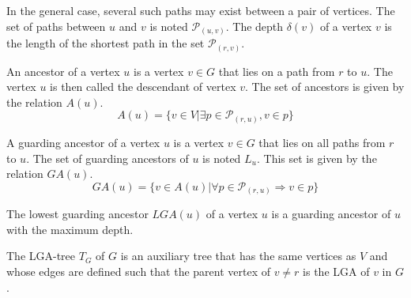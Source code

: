 In the general case, several such paths may exist between a pair of vertices.
The set of paths between $u$ and $v$ is noted $\mathcal{P}_{(u,v)}$.
The depth $\delta(v)$ of a vertex $v$ is the length of the shortest path in the set $\mathcal{P}_{(r,v)}$.
\begin{definition}
	An ancestor of a vertex $u$ is a vertex $v \in G$ that lies on a path from $r$ to $u$. The vertex $u$ is then called the descendant of vertex $v$.
	The set of ancestors is given by the relation $A(u)$.
	\begin{equation*}
		A(u)=\{v\in V|\exists p\in \mathcal{P}_{(r,u)}, v \in p\}
	\end{equation*}
\end{definition}

\begin{definition}
	A guarding ancestor of a vertex $u$ is a vertex $v \in G$ that lies on all paths from $r$ to $u$.
	The set of guarding ancestors of $u$ is noted $L_u$.
	This set is given by the relation $GA(u)$.
	\begin{equation*}
		GA(u) =	\{v\in A(u)|\forall p\in \mathcal{P}_{(r,u)}\Rightarrow v\in p\}
	\end{equation*}
\end{definition}

\begin{definition}
	The lowest guarding ancestor $LGA(u)$ of a vertex $u$ is a guarding ancestor of $u$ with the maximum depth.
\end{definition}

\begin{definition}
	The LGA-tree $T_G$ of $G$  is an auxiliary tree that has the same vertices as $V$ and whose edges are defined such that the parent vertex of $v \neq r$ is the LGA of $v$ in $G$.
\end{definition}

